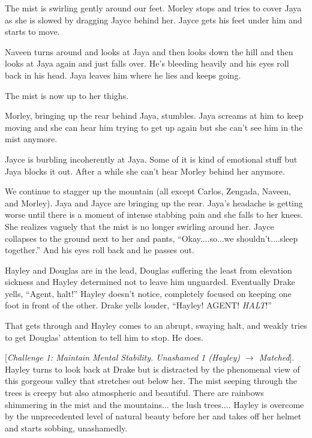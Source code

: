 The mist is swirling gently around our feet.  Morley stops and tries to cover Jaya as she is slowed by dragging Jayce behind her.  Jayce gets his feet under him and starts to move. 

Naveen turns around and looks at Jaya and then looks down the hill and then looks at Jaya again and just falls over.  He's bleeding heavily and his eyes roll back in his head.  Jaya leaves him where he lies and keeps going.

The mist is now up to her thighs.  

Morley, bringing up the rear behind Jaya, stumbles.  Jaya screams at him to keep moving and she can hear him trying to get up again but she can't see him in the mist anymore.  

Jayce is burbling incoherently at Jaya. Some of it is kind of emotional stuff but Jaya blocks it out.  After a while she can't hear Morley behind her anymore.



We continue to stagger up the mountain (all except Carlos, Zengada, Naveen, and Morley).  Jaya and Jayce are bringing up the rear.  Jaya's headache is getting worse until there is a moment of intense stabbing pain and she falls to her knees.  She realizes vaguely that the mist is no longer swirling around her.  Jayce collapses to the ground next to her and pants, ``Okay....so...we shouldn't....sleep together.''  And his eyes roll back and he passes out.

Hayley and Douglas are in the lead, Douglas suffering the least from elevation sickness and Hayley determined not to leave him unguarded.  Eventually Drake yells, ``Agent, halt!''  Hayley doesn't notice, completely focused on keeping one foot in front of the other.  Drake yells louder, ``Hayley!  AGENT!  \textit{HALT}!''

That gets through and Hayley comes to an abrupt, swaying halt, and weakly tries to get Douglas' attention to tell him to stop.  He does.



{[}\textit{Challenge 1: Maintain Mental Stability.  Unashamed 1 (Hayley) $\rightarrow$ Matched}{]}.  Hayley turns to look back at Drake but is distracted by the phenomenal view of this gorgeous valley that stretches out below her.  The mist seeping through the trees is creepy but also atmospheric and beautiful.  There are rainbows shimmering in the mist and the mountains... the lush trees....  Hayley is overcome by the unprecedented level of natural beauty before her and takes off her helmet and starts sobbing, unashamedly.

